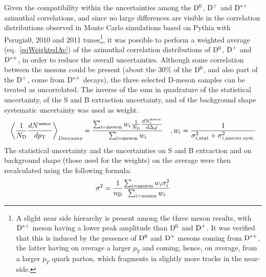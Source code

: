 %
%
%
%
Given the compatibility within the uncertainties among the ${\rm D^0}$, ${\rm D^+}$ and ${\rm D^{*+}}$ azimuthal correlations, and since no large differences are visible in the correlation distributions observed in Monte Carlo simulations based on Pythia with Perugia0, 2010 and 2011 tunes\footnote{A slight near side hierarchy is present among the three meson results, with ${\rm D^{*+}}$ meson having a lower peak amplitude than ${\rm D^0}$ and ${\rm D^+}$. It was verified that this is induced by the presence of ${\rm D^0}$ and ${\rm D^+}$ mesons coming from ${\rm D^{*+}}$, the latter having on average a larger $p_T$ and coming, hence, on average, from a larger $p_T$ quark parton, which fragments in slightly more tracks in the near-side.},
it was possible to perform a weighted average (eq.~\ref{eqWeightedAv}) of the azimuthal correlation distributions of ${\rm D^0}$, ${\rm D^+}$ and ${\rm D^{*+}}$, in order to reduce the overall uncertainties.
Although some correlation between the mesons could be present (about the 30$\%$ of the ${\rm D^0}$, and also part of the ${\rm D^+}$, come from ${\rm D^{*+}}$ decays), the three selected D-meson samples can be treated as uncorrelated. The inverse of the sum in quadrature of the statistical uncertainty, of the S and B extraction uncertainty, and of the background shape systematic uncertainty was used as weight.
\begin{equation}
  \left \langle \frac{1}{N_{\rm D}}\frac{dN^{\rm assoc}}{dp_{\rm T}} \right \rangle_{D mesons} =  \frac{\sum_{\rm i=meson}w_{i}\frac{1}{N_{\rm D}}\frac{dN^{\rm assoc}_{i}}{d\Delta\varphi}}{\sum_{\rm i=meson}w_{i}}\quad , w_{i}=\frac{1}{\sigma^{2}_{i, \rm stat}+\sigma^{2}_{i, \rm uncorr. syst.}}
\label{eqWeightedAv}
\end{equation}
The statistical uncertainty and the uncertainties on S and B extraction and on background shape (those used for the weights) on the average were then recalculated using the following formula:
\begin{equation}
  \sigma^{2}=\frac{1}{n_{\rm D}}\frac{\sum_{\rm i=meson}w_{i}\sigma^{2}_{i}}{\sum_{\rm i=meson}w_{i}}
\end{equation}
